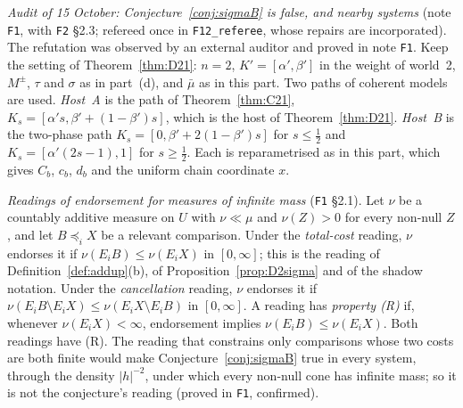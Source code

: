 \documentclass[11pt]{article}
\theoremstyle{definition}
\theoremstyle{remark}
\newcommand{\src}[1]{\texttt{#1}}
\begin{document}
\emph{Audit of 15 October: Conjecture~\ref{conj:sigmaB} is false, and nearby systems} (note \src{F1}, with \src{F2} \S2.3; refereed once in \src{F12\_referee}, whose repairs are incorporated). The refutation was observed by an external auditor and proved in note \src{F1}. Keep the setting of Theorem~\ref{thm:D21}: $n=2$, $K'=[\alpha',\beta']$ in the weight of world~2, $M^\pm$, $\tau$ and $\sigma$ as in part~(d), and $\bar\mu$ as in this part. Two paths of coherent models are used. \emph{Host~A} is the path of Theorem~\ref{thm:C21}, $K_s=[\alpha's,\beta'+(1-\beta')s]$, which is the host of Theorem~\ref{thm:D21}. \emph{Host~B} is the two-phase path $K_s=[0,\beta'+2(1-\beta')s]$ for $s\le\frac12$ and $K_s=[\alpha'(2s-1),1]$ for $s\ge\frac12$. Each is reparametrised as in this part, which gives $C_b$, $c_b$, $d_b$ and the uniform chain coordinate $x$.

\emph{Readings of endorsement for measures of infinite mass} (\src{F1} \S2.1). Let $\nu$ be a countably additive measure on $U$ with $\nu\ll\mu$ and $\nu(Z)>0$ for every non-null $Z$, and let $B\preceq_iX$ be a relevant comparison. Under the \emph{total-cost} reading, $\nu$ endorses it if $\nu(E_iB)\le\nu(E_iX)$ in $[0,\infty]$; this is the reading of Definition~\ref{def:addup}(b), of Proposition~\ref{prop:D2sigma} and of the shadow notation. Under the \emph{cancellation} reading, $\nu$ endorses it if $\nu(E_iB\setminus E_iX)\le\nu(E_iX\setminus E_iB)$ in $[0,\infty]$. A reading has \emph{property (R)} if, whenever $\nu(E_iX)<\infty$, endorsement implies $\nu(E_iB)\le\nu(E_iX)$. Both readings have (R). The reading that constrains only comparisons whose two costs are both finite would make Conjecture~\ref{conj:sigmaB} true in every system, through the density $|h|^{-2}$, under which every non-null cone has infinite mass; so it is not the conjecture's reading (proved in \src{F1}, confirmed).
\end{document}
